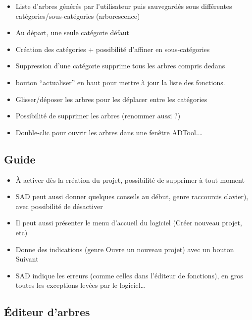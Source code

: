 		\begin{itemize}
			\item Liste d'arbres générés par l'utilisateur puis sauvegardés sous différentes catégories/sous-catégories (arborescence)
			\item Au départ, une seule catégorie défaut
			\item  Création des catégories + possibilité d'affiner en sous-catégories
			\item Suppression d'une catégorie supprime tous les arbres compris dedans
			\item bouton “actualiser” en haut pour mettre à jour la liste des fonctions.
			\item Glisser/déposer les arbres pour les déplacer entre les catégories
			\item Possibilité de supprimer les arbres (renommer aussi ?)
			\item Double-clic pour ouvrir les arbres dans une fenêtre ADTool.\ldots
		\end{itemize}
		

	\subsection{Guide}

		\begin{itemize}
			\item À activer dès la création du projet, possibilité de supprimer à tout moment 
			\item SAD peut aussi donner quelques conseils au début, genre raccourcis clavier), avec possibilité de désactiver
			\item Il peut aussi présenter le menu d'accueil du logiciel (Créer nouveau projet, etc)
			\item Donne des indications (genre Ouvre un nouveau projet) avec un bouton Suivant			
			\item SAD indique les erreurs (comme celles dans l'éditeur de fonctions), en gros toutes les exceptions levées par le logiciel\ldots
		\end{itemize}


	\subsection{Éditeur d'arbres}

